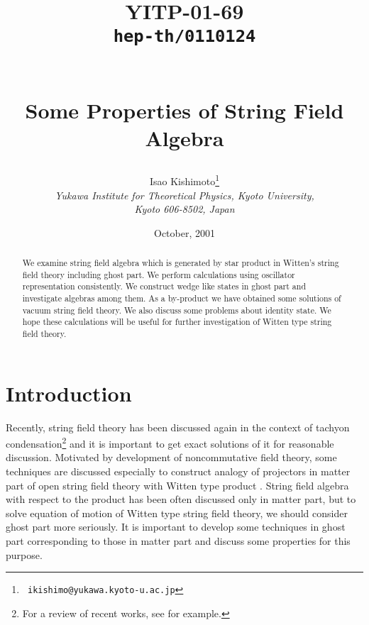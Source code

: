 \documentclass[12pt,a4paper]{article}
\begin{document}
\begin{titlepage}
\title{
\hfill\parbox{4cm}
{\normalsize YITP-01-69\\{\tt hep-th/0110124}}\\
\vspace{1cm}
Some Properties of String Field Algebra}
\author{
Isao {\sc Kishimoto}\thanks{{\tt
    ikishimo@yukawa.kyoto-u.ac.jp}}
\\[7pt]
{\it Yukawa Institute for Theoretical Physics, Kyoto University,}\\
{\it  Kyoto 606-8502, Japan}
}
\date{\normalsize October, 2001}
\maketitle
\thispagestyle{empty}

\begin{abstract}
\normalsize
We examine string field algebra which is generated by star product in Witten's string field theory including ghost part. We perform calculations using oscillator representation consistently. We construct wedge like states in ghost part and investigate algebras among them.  As a by-product we have obtained some solutions of vacuum string field theory. We also discuss some problems about identity state. We hope these calculations will be useful for further investigation of Witten type string field theory.
\end{abstract}

 
\end{titlepage}



\section{Introduction}

Recently, string field theory has been discussed again in the context of tachyon condensation\footnote{
	For a review of recent works, see \cite{KO} for example.
} and it is important to get exact solutions of it for reasonable discussion. 
Motivated by development of noncommutative field theory, some techniques are discussed especially to construct analogy of projectors in matter part of open string field theory with Witten type \myHighlight{$\star$}\coordHE{} product \cite{Witten}.
String field algebra with respect to the \myHighlight{$\star$}\coordHE{} product has been often discussed only in matter part, but to solve equation of motion of Witten type string field theory, we should consider ghost part more seriously. It is important to develop some techniques in ghost part corresponding to those in matter part and discuss some properties for this purpose.
\end{document}
